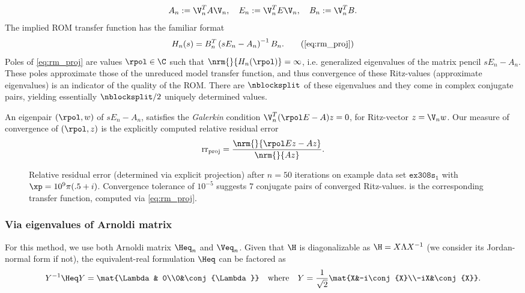 \begin{equation*}
          A_n := \V_n^TA\V_n, \quad E_n := \V_n^TE\V_n, \quad B_n := \V_n^TB.
  \label{}
\end{equation*}
The implied ROM transfer function has the familiar format
 \begin{equation*}
     H_n(s) = B_n^T\left(sE_n-A_n\right)^{-1}B_n.
    \tag{\ref{eq:rm_proj}}
 \end{equation*}
Poles of \eqref{eq:rm_proj} are values $\rpol\in\C$ such that $\nrm{}{H_n(\rpol)}=\infty$, i.e.
generalized eigenvalues of the matrix pencil $sE_n-A_n$.  These  poles approximate those
of the unreduced model transfer function, and thus convergence of these Ritz-values
(approximate eigenvalues) is an indicator of the quality of the ROM.
There are $\nblocksplit$ of these eigenvalues and they come in complex conjugate pairs,
yielding essentially $\nblocksplit / 2$ uniquely determined values.

An eigenpair $(\rpol,w)$ of $sE_n-A_n$, satisfies the \emph{Galerkin} condition
$\V_n^T(\rpol E - A)z=0$, for Ritz-vector $z=\V_n w$.
Our measure of convergence of $(\rpol,z)$ is the explicitly computed relative residual error
  \begin{equation*}
      \mathrm{rr_{proj}} = \frac{\nrm{}{\rpol Ez - Az}}{\nrm{}{Az}}.
  \end{equation*}


\begin{figure}[htbp]
	\centering
	\hfill
	\caption{Relative residual error (determined via explicit projection)
	 after $n=50$ iterations on example data set
	 $\mathtt{ex308s_1}$ with $\xp=10^9\pi(.5+i)$.  Convergence tolerance of $10^{-5}$
	 suggests $7$ conjugate pairs of converged Ritz-values.  
	 is the corresponding transfer function, computed via \eqref{eq:rm_proj}.
 	}
	\label{fig:rrproj308s1w50}
\end{figure}



\subsubsection{Via eigenvalues of Arnoldi matrix}
For this method, we use both Arnoldi matrix $\Heq_n$ and $\Veq_n$.
Given that $\H$ is diagonalizable as  $\H = X\Lambda X^{-1}$ (we consider its
Jordan-normal form if not),  the equivalent-real formulation
$\Heq$ can be factored \cite[Proposition 5.1]{AN} as
\begin{equation}
Y^{-1}\Heq Y = \mat{\Lambda& 0\\0&\conj{\Lambda}} \quad\text{where}\quad
Y = \frac{1}{\sqrt{2}}\mat{X&-i\conj{X}\\-iX&\conj{X}}
.
\label{eq:eqrealeigstruct}
\end{equation}

